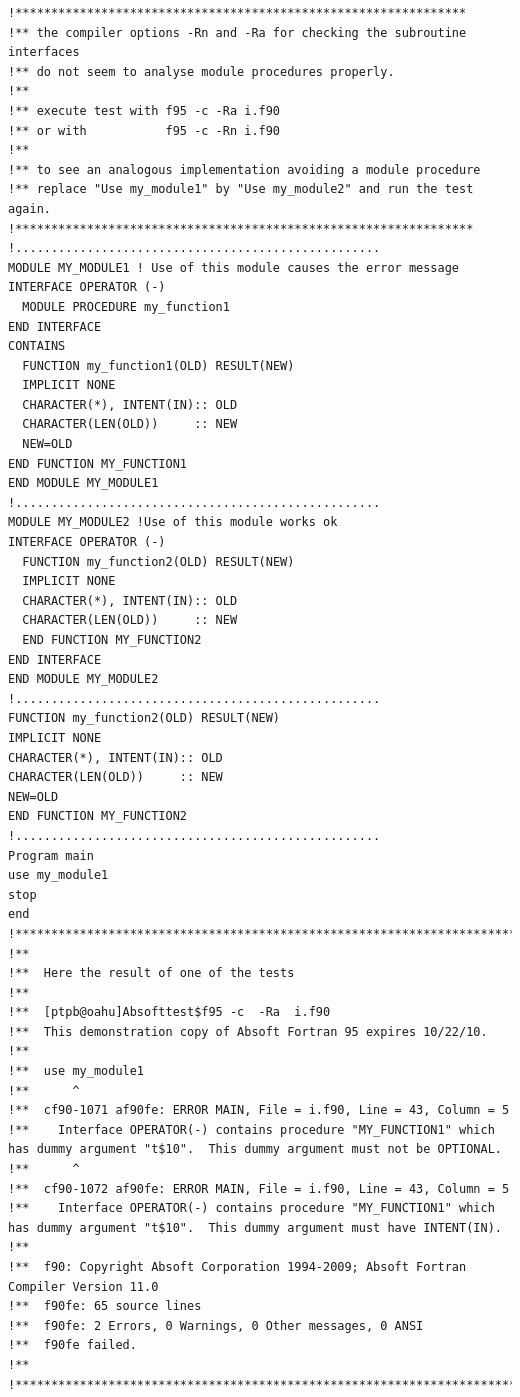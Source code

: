 \documentclass[a4paper,10pt]{report}
\begin{document}
\begin{verbatim}
!***************************************************************
!** the compiler options -Rn and -Ra for checking the subroutine interfaces
!** do not seem to analyse module procedures properly.
!**
!** execute test with f95 -c -Ra i.f90
!** or with           f95 -c -Rn i.f90
!** 
!** to see an analogous implementation avoiding a module procedure
!** replace "Use my_module1" by "Use my_module2" and run the test again. 
!****************************************************************
!...................................................
MODULE MY_MODULE1 ! Use of this module causes the error message
INTERFACE OPERATOR (-)
  MODULE PROCEDURE my_function1
END INTERFACE
CONTAINS
  FUNCTION my_function1(OLD) RESULT(NEW)
  IMPLICIT NONE
  CHARACTER(*), INTENT(IN):: OLD
  CHARACTER(LEN(OLD))     :: NEW
  NEW=OLD
END FUNCTION MY_FUNCTION1
END MODULE MY_MODULE1
!...................................................
MODULE MY_MODULE2 !Use of this module works ok
INTERFACE OPERATOR (-)
  FUNCTION my_function2(OLD) RESULT(NEW)
  IMPLICIT NONE
  CHARACTER(*), INTENT(IN):: OLD
  CHARACTER(LEN(OLD))     :: NEW
  END FUNCTION MY_FUNCTION2
END INTERFACE
END MODULE MY_MODULE2
!...................................................
FUNCTION my_function2(OLD) RESULT(NEW)
IMPLICIT NONE
CHARACTER(*), INTENT(IN):: OLD
CHARACTER(LEN(OLD))     :: NEW
NEW=OLD
END FUNCTION MY_FUNCTION2
!...................................................
Program main
use my_module1
stop
end
!******************************************************************************************************************************************
!**  
!**  Here the result of one of the tests
!**  
!**  [ptpb@oahu]Absofttest$f95 -c  -Ra  i.f90            
!**  This demonstration copy of Absoft Fortran 95 expires 10/22/10.
!**  
!**  use my_module1
!**      ^          
!**  cf90-1071 af90fe: ERROR MAIN, File = i.f90, Line = 43, Column = 5 
!**    Interface OPERATOR(-) contains procedure "MY_FUNCTION1" which has dummy argument "t$10".  This dummy argument must not be OPTIONAL.
!**      ^          
!**  cf90-1072 af90fe: ERROR MAIN, File = i.f90, Line = 43, Column = 5 
!**    Interface OPERATOR(-) contains procedure "MY_FUNCTION1" which has dummy argument "t$10".  This dummy argument must have INTENT(IN).
!**  
!**  f90: Copyright Absoft Corporation 1994-2009; Absoft Fortran Compiler Version 11.0 
!**  f90fe: 65 source lines
!**  f90fe: 2 Errors, 0 Warnings, 0 Other messages, 0 ANSI
!**  f90fe failed.
!**
!******************************************************************************************************************************************
\end{verbatim}

\printindex
\end{document}
